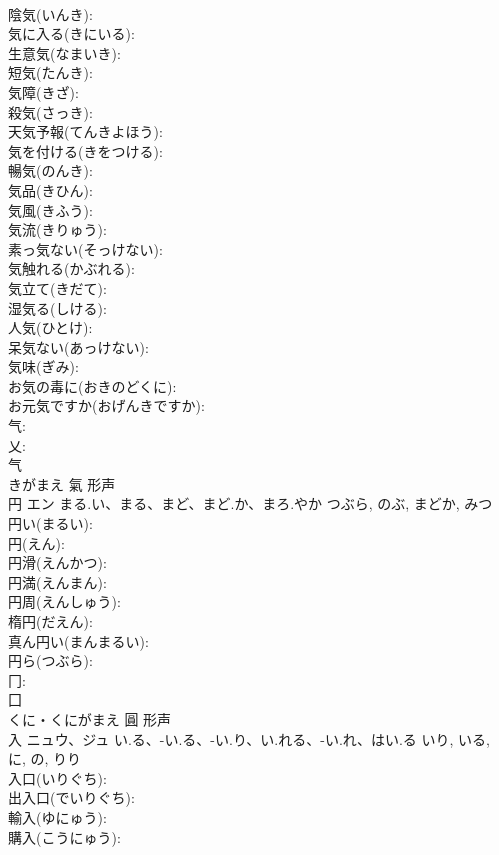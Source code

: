 \documentclass[8pt]{extreport}
\begin{document}
\begin{CJK}{UTF8}{min}
\\	陰気(いんき): 
\\	気に入る(きにいる): 
\\	生意気(なまいき): 
\\	短気(たんき): 
\\	気障(きざ): 
\\	殺気(さっき): 
\\	天気予報(てんきよほう): 
\\	気を付ける(きをつける): 
\\	暢気(のんき): 
\\	気品(きひん): 
\\	気風(きふう): 
\\	気流(きりゅう): 
\\	素っ気ない(そっけない): 
\\	気触れる(かぶれる): 
\\	気立て(きだて): 
\\	湿気る(しける): 
\\	人気(ひとけ): 
\\	呆気ない(あっけない): 
\\	気味(ぎみ): 
\\	お気の毒に(おきのどくに): 
\\	お元気ですか(おげんきですか): 
\\	气: 
\\	乂: 
\\	气	
\\	きがまえ	氣	形声 
\\	円	エン	まる.い、まる、まど、まど.か、まろ.やか	つぶら, のぶ, まどか, みつ	
\\	円い(まるい): 
\\	円(えん): 
\\	円滑(えんかつ): 
\\	円満(えんまん): 
\\	円周(えんしゅう): 
\\	楕円(だえん): 
\\	真ん円い(まんまるい): 
\\	円ら(つぶら): 
\\	冂: 
\\	囗	
\\	くに・くにがまえ	圓	形声 
\\	入	ニュウ、ジュ	い.る、-い.る、-い.り、い.れる、-い.れ、はい.る	いり, いる, に, の, りり	
\\	入口(いりぐち): 
\\	出入口(でいりぐち): 
\\	輸入(ゆにゅう): 
\\	購入(こうにゅう): 

\end{CJK}
\end{document}
